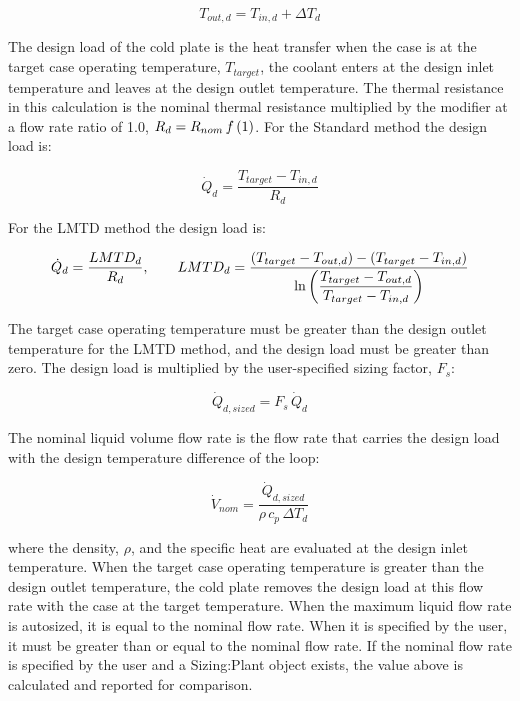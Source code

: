 \begin{equation}
T_{out,d} = T_{in,d} + \Delta T_{d}
\end{equation}

The design load of the cold plate is the heat transfer when the case is at the target case operating temperature, \(T_{target}\), the coolant enters at the design inlet temperature and leaves at the design outlet temperature. The thermal resistance in this calculation is the nominal thermal resistance multiplied by the modifier at a flow rate ratio of 1.0, \(R_{d} = R_{nom} \, f\left(1\right)\). For the Standard method the design load is:

\begin{equation}
\dot{Q}_{d} = \frac{T_{target} - T_{in,d}}{R_{d}}
\end{equation}

For the LMTD method the design load is:

\begin{equation}
\dot{Q}_{d} = \frac{LMTD_{d}}{R_{d}}, \qquad LMTD_{d} = \frac{\left(T_{target} - T_{out,d}\right) - \left(T_{target} - T_{in,d}\right)}{\ln\left(\dfrac{T_{target} - T_{out,d}}{T_{target} - T_{in,d}}\right)}
\end{equation}

The target case operating temperature must be greater than the design outlet temperature for the LMTD method, and the design load must be greater than zero. The design load is multiplied by the user-specified sizing factor, \(F_{s}\):

\begin{equation}
\dot{Q}_{d,sized} = F_{s} \, \dot{Q}_{d}
\end{equation}

The nominal liquid volume flow rate is the flow rate that carries the design load with the design temperature difference of the loop:

\begin{equation}
\dot{V}_{nom} = \frac{\dot{Q}_{d,sized}}{\rho \, c_p \, \Delta T_{d}}
\end{equation}

where the density, \(\rho\), and the specific heat are evaluated at the design inlet temperature. When the target case operating temperature is greater than the design outlet temperature, the cold plate removes the design load at this flow rate with the case at the target temperature. When the maximum liquid flow rate is autosized, it is equal to the nominal flow rate. When it is specified by the user, it must be greater than or equal to the nominal flow rate. If the nominal flow rate is specified by the user and a Sizing:Plant object exists, the value above is calculated and reported for comparison.

